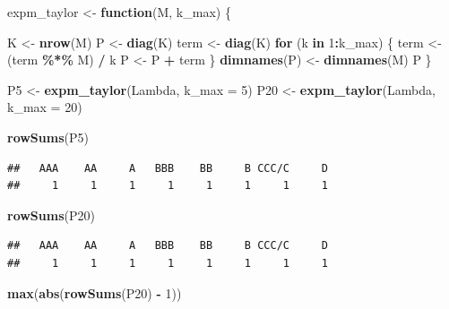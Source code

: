 \documentclass[
  11pt,
]{article}
\newenvironment{Shaded}{\begin{snugshade}}{\end{snugshade}}
\newcommand{\AttributeTok}[1]{\textcolor[rgb]{0.13,0.29,0.53}{#1}}
\newcommand{\ControlFlowTok}[1]{\textcolor[rgb]{0.13,0.29,0.53}{\textbf{#1}}}
\newcommand{\DecValTok}[1]{\textcolor[rgb]{0.00,0.00,0.81}{#1}}
\newcommand{\FunctionTok}[1]{\textcolor[rgb]{0.13,0.29,0.53}{\textbf{#1}}}
\newcommand{\NormalTok}[1]{#1}
\newcommand{\OtherTok}[1]{\textcolor[rgb]{0.56,0.35,0.01}{#1}}
\newcommand{\SpecialCharTok}[1]{\textcolor[rgb]{0.81,0.36,0.00}{\textbf{#1}}}
\begin{document}
\begin{Shaded}
\begin{Highlighting}[]
\NormalTok{expm\_taylor }\OtherTok{\textless{}{-}} \ControlFlowTok{function}\NormalTok{(M, k\_max) \{}

\NormalTok{    K }\OtherTok{\textless{}{-}} \FunctionTok{nrow}\NormalTok{(M)}
\NormalTok{    P }\OtherTok{\textless{}{-}} \FunctionTok{diag}\NormalTok{(K)}
\NormalTok{    term }\OtherTok{\textless{}{-}} \FunctionTok{diag}\NormalTok{(K)}
    \ControlFlowTok{for}\NormalTok{ (k }\ControlFlowTok{in} \DecValTok{1}\SpecialCharTok{:}\NormalTok{k\_max) \{}
\NormalTok{        term }\OtherTok{\textless{}{-}}\NormalTok{ (term }\SpecialCharTok{\%*\%}\NormalTok{ M) }\SpecialCharTok{/}\NormalTok{ k}
\NormalTok{        P }\OtherTok{\textless{}{-}}\NormalTok{ P }\SpecialCharTok{+}\NormalTok{ term}
\NormalTok{    \}}
    \FunctionTok{dimnames}\NormalTok{(P) }\OtherTok{\textless{}{-}} \FunctionTok{dimnames}\NormalTok{(M)}
\NormalTok{    P}
\NormalTok{\}}

\NormalTok{P5 }\OtherTok{\textless{}{-}}  \FunctionTok{expm\_taylor}\NormalTok{(Lambda, }\AttributeTok{k\_max =} \DecValTok{5}\NormalTok{)}
\NormalTok{P20 }\OtherTok{\textless{}{-}} \FunctionTok{expm\_taylor}\NormalTok{(Lambda, }\AttributeTok{k\_max =} \DecValTok{20}\NormalTok{)}


\FunctionTok{rowSums}\NormalTok{(P5)}
\end{Highlighting}
\end{Shaded}

\begin{verbatim}
##   AAA    AA     A   BBB    BB     B CCC/C     D 
##     1     1     1     1     1     1     1     1
\end{verbatim}

\begin{Shaded}
\begin{Highlighting}[]
\FunctionTok{rowSums}\NormalTok{(P20)}
\end{Highlighting}
\end{Shaded}

\begin{verbatim}
##   AAA    AA     A   BBB    BB     B CCC/C     D 
##     1     1     1     1     1     1     1     1
\end{verbatim}

\begin{Shaded}
\begin{Highlighting}[]
\FunctionTok{max}\NormalTok{(}\FunctionTok{abs}\NormalTok{(}\FunctionTok{rowSums}\NormalTok{(P20) }\SpecialCharTok{{-}} \DecValTok{1}\NormalTok{))}
\end{Highlighting}
\end{Shaded}
\end{document}
